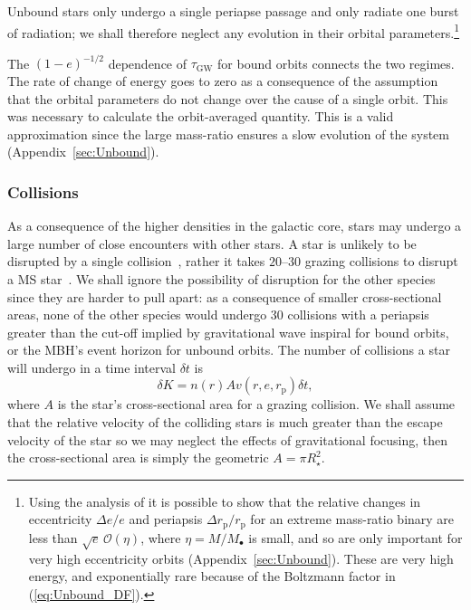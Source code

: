 \documentclass[useAMS,usedcolumn,usegraphicx,usenatbib]{mn2e}
\newcommand{\eqnref}[1]{(\ref{eq:#1})}
\newcommand{\apref}[1]{Appendix~\ref{sec:#1}}
\newcommand{\sub}[1]{\ensuremath{_\mathrm{#1}}}
\newcommand{\order}[1]{\ensuremath{\mathcal{O}({#1})}}
\begin{document}
Unbound stars only undergo a single periapse passage and only radiate one burst of radiation; we shall therefore neglect any evolution in their orbital parameters.\footnote{Using the analysis of \citet{Turner1977} it is possible to show that the relative changes in eccentricity $\Delta e / e$ and periapsis $\Delta r\sub{p} / r\sub{p}$ for an extreme mass-ratio binary are less than $\sqrt{e}\,\order{\eta}$, where $\eta = M/M_\bullet$ is small, and so are only important for very high eccentricity orbits (\apref{Unbound}). These are very high energy, and exponentially rare because of the Boltzmann factor in \eqnref{Unbound_DF}.}

The $(1-e)^{-1/2}$ dependence of $\tau\sub{GW}$ for bound orbits connects the two regimes. The rate of change of energy goes to zero as a consequence of the assumption that the orbital parameters do not change over the cause of a single orbit. This was necessary to calculate the orbit-averaged quantity. This is a valid approximation since the large mass-ratio ensures a slow evolution of the system (\apref{Unbound}).

\subsubsection{Collisions}\label{sec:Collision}

As a consequence of the higher densities in the galactic core, stars may undergo a large number of close encounters with other stars. A star is unlikely to be disrupted by a single collision~\citep{Freitag2005}, rather it takes $20$--$30$ grazing collisions to disrupt a MS star~\citep{Freitag2006}. We shall ignore the possibility of disruption for the other species since they are harder to pull apart: as a consequence of smaller cross-sectional areas, none of the other species would undergo 30 collisions with a periapsis greater than the cut-off implied by gravitational wave inspiral for bound orbits, or the MBH's event horizon for unbound orbits. The number of collisions a star will undergo in a time interval $\delta t$ is
\begin{equation}
\delta K = n(r) A v(r,e,r\sub{p})\delta t,
\end{equation}
where $A$ is the star's cross-sectional area for a grazing collision. We shall assume that the relative velocity of the colliding stars is much greater than the escape velocity of the star so we may neglect the effects of gravitational focusing, then the cross-sectional area is simply the geometric $A = \pi R_\star^2$.
\end{document}
